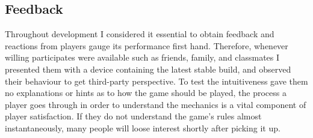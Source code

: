 \documentclass[final]{cmpreport}
\begin{document}

\subsection{Feedback}
Throughout development I considered it essential to obtain feedback and reactions from players gauge its performance first hand. Therefore, whenever willing participates were available such as friends, family, and classmates I presented them with a device containing the latest stable build, and observed their behaviour to get third-party perspective. To test the intuitiveness gave them no explanations or hints as to how the game should be played, the process a player goes through in order to understand the mechanics is a vital component of player satisfaction. If they do not understand the game's rules almost instantaneously, many people will loose interest shortly after picking it up.
\end{document}
